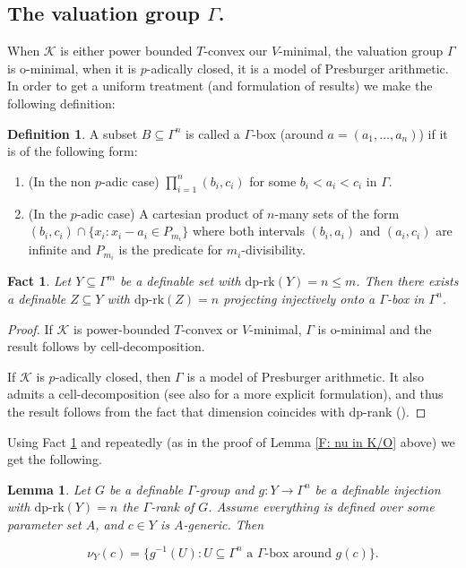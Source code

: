 \documentclass[11pt]{amsart}
\newtheorem{fact}[theorem]{Fact}
\newtheorem{lemma}[theorem]{Lemma}
\theoremstyle{definition}
\newtheorem{definition}[theorem]{Definition}
\newcommand{\CK}{{\mathcal K}}
\newcommand{\0}{\emptyset}
\def\dpr{\mathrm{dp\text{-}rk}}
\begin{document}
\subsection{The valuation group $\Gamma$.}\label{ss:infnit of gamma}
When $\CK$ is either power bounded $T$-convex our $V$-minimal, the valuation group $\Gamma$ is o-minimal, when it is $p$-adically closed, it is a model of Presburger arithmetic.  In order to get a uniform treatment (and formulation of results) we make the following definition:

\begin{definition}\label{D:box}
A subset $B\subseteq \Gamma^n$ is called a $\Gamma$-box (around $a=(a_1,\dots,a_n)$) if it is of the following form:
\begin{enumerate}
    \item (In the non $p$-adic case) $\prod_{i=1}^n (b_i,c_i)$ for some $b_i<a_i<c_i$ in $\Gamma$.
    \item  (In the $p$-adic case)   A cartesian product of $n$-many sets of the form $(b_i,c_i)\cap \{x_i: x_i-a_i\in P_{m_i}\}$ where both intervals $(b_i,a_i)$ and $(a_i,c_i)$ are infinite and $P_{m_i}$ is the predicate for $m_i$-divisibility.
\end{enumerate}
\end{definition}

\begin{fact}\label{F:minimal fibers in Gamma} 
Let $Y\subseteq \Gamma^m$ be a definable set with $\dpr(Y)=n\leq m$. Then there exists a definable $Z\subseteq Y$ with $\dpr(Z)=n$ projecting injectively onto a $\Gamma$-box in $\Gamma^n$. 
\end{fact}
\begin{proof}
    If $\CK$ is power-bounded $T$-convex or $V$-minimal, $\Gamma$ is o-minimal and the result follows by cell-decomposition.

    If $\CK$ is $p$-adically closed, then $\Gamma$ is a model of Presburger arithmetic. It also admits a cell-decomposition  \cite{ClucPresburger} (see also \cite[Fact 2.4]{OnVi} for a more explicit formulation), and thus the result follows from the fact that dimension coincides with dp-rank (\cite[Theorem 0.3]{Simdp}).
\end{proof}

Using Fact \ref{F:minimal fibers in Gamma} and \cite[Lemma 4.2]{HaHaPeGps} repeatedly (as in the proof of Lemma \ref{F: nu in K/O} above) we get the following.

\begin{lemma}\label{L: inf neigh in Gamma}
    Let $G$ be a definable $\Gamma$-group and $g:Y\to \Gamma^n$ be a definable injection with $\dpr(Y)=n$ the $\Gamma$-rank of $G$. Assume everything is defined over some parameter set $A$, and $c\in Y$ is $A$-generic. Then
     
    \[\nu_Y(c)=\{g^{-1}(U): U\subseteq \Gamma^n \text{ a $\Gamma$-box around $g(c)$}\}.\]
\end{lemma}
\end{document}
